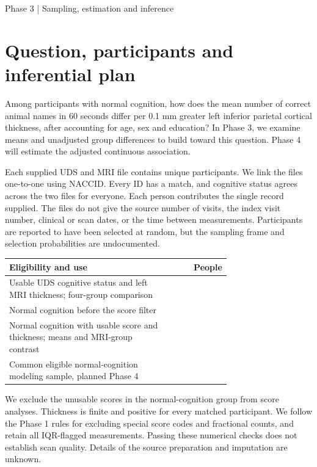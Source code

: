 \documentclass[11pt]{article}
\begin{document}
\par
\vspace{5mm}
{\Large Phase 3 | Sampling, estimation and inference\par}

\section{Question, participants and inferential plan}
Among participants with normal cognition, how does the mean number of
correct animal names in 60 seconds differ per 0.1 mm greater left inferior
parietal cortical thickness, after accounting for age, sex and education?
In Phase 3, we examine means and unadjusted group differences to build
toward this question. Phase 4 will estimate the adjusted continuous association.

Each supplied UDS and MRI file contains \StatusN{} unique participants.
We link the files one-to-one using NACCID. Every ID has a match, and
cognitive status agrees across the two files for everyone. Each person
contributes the single record supplied. The files do not give the source
number of visits, the index visit number, clinical or scan dates, or the
time between measurements. Participants are reported to have been selected
at random, but the sampling frame and selection probabilities are undocumented.

\begin{center}\small
\begin{tabular}{@{}p{0.72\linewidth}r@{}}
\toprule
Eligibility and use & People \\
\midrule
Usable UDS cognitive status and left MRI thickness; four-group comparison & \StatusN{} \\
Normal cognition before the score filter & \NormalN{} \\
Normal cognition with usable score and thickness; means and MRI-group contrast & \PairedN{} \\
Common eligible normal-cognition modeling sample, planned Phase 4 & \ModelN{} \\
\bottomrule
\end{tabular}
\end{center}

We exclude the \MissingScoreN{} unusable scores in the normal-cognition
group from score analyses. Thickness is finite and positive for every
matched participant. We follow the Phase 1 rules for excluding special
score codes and fractional counts, and retain all IQR-flagged measurements.
Passing these numerical checks does not establish scan quality. Details
of the source preparation and imputation are unknown.
\end{document}
